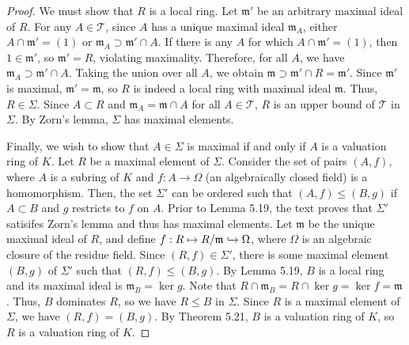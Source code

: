 \begin{proof}
We must show that $R$ is a local ring. Let $\mathfrak{m}'$ be an arbitrary maximal ideal of $R$. For any $A \in \mathcal{T}$, since $A$ has
a unique maximal ideal $\mathfrak{m}_A$, either $A \cap \mathfrak{m}' = (1)$ or $\mathfrak{m}_A \supset \mathfrak{m}' \cap A$. If there is any $A$
for which $A \cap \mathfrak{m}' = (1)$, then $1 \in \mathfrak{m}'$, so $\mathfrak{m}' = R$, violating maximality. Therefore, for all $A$,
we have $\mathfrak{m}_A \supset \mathfrak{m}' \cap A$. Taking the union over all $A$, we obtain $\mathfrak{m} \supset \mathfrak{m}' \cap R = \mathfrak{m}'$.
Since $\mathfrak{m}'$ is maximal, $\mathfrak{m}' = \mathfrak{m}$, so $R$ is indeed a local ring with maximal ideal $\mathfrak{m}$. Thus, $R \in \Sigma$.
Since $A \subset R$ and $\mathfrak{m}_A = \mathfrak{m} \cap A$ for all $A \in \mathcal{T}$, $R$ is an upper bound of $\mathcal{T}$ in $\Sigma$. By Zorn's
lemma, $\Sigma$ has maximal elements.

Finally, we wish to show that $A \in \Sigma$ is maximal if and only if $A$ is a valuation ring of $K$. Let $R$ be a maximal element of $\Sigma$. Consider
the set of pairs $(A,f)$, where $A$ is a subring of $K$ and $f : A \to \Omega$ (an algebraically closed field) is a homomorphism. Then, the set $\Sigma'$ can be
ordered such that $(A,f) \le (B,g)$ if $A \subset B$ and $g$ restricts to $f$ on $A$. Prior to Lemma 5.19, the text proves that $\Sigma'$ satisifes Zorn's lemma
and thus has maximal elements. Let $\mathfrak{m}$ be the unique maximal ideal of $R$, and define $f : R \mapsto R/\mathfrak{m} \xhookrightarrow{} \Omega$, where
$\Omega$ is an algebraic closure of the residue field. Since $(R,f) \in \Sigma'$, there is some maximal element $(B,g)$ of $\Sigma'$ such that $(R,f) \le (B,g)$.
By Lemma 5.19, $B$ is a local ring and its maximal ideal is $\mathfrak{m}_B = \ker g$. Note that $R \cap \mathfrak{m}_B = R \cap \ker g = \ker f = \mathfrak{m}$.
Thus, $B$ dominates $R$, so we have $R \le B$ in $\Sigma$. Since $R$ is a maximal element of $\Sigma$, we have $(R,f) = (B,g)$. By Theorem 5.21, $B$ is a valuation
ring of $K$, so $R$ is a valuation ring of $K$.


\end{proof}

